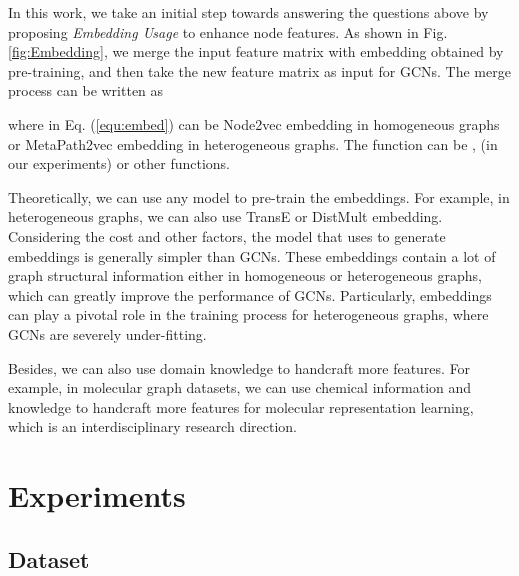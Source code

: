 \documentclass[runningheads]{llncs}
\begin{document}
In this work, we take an initial step towards answering the
questions above by proposing \textsl{Embedding Usage} to enhance node features. As shown in Fig. \ref{fig:Embedding}, we merge
the input feature matrix  with embedding obtained by
pre-training, and then take the new feature matrix as input for GCNs. The merge process can be written as


where  in Eq. (\ref{equ:embed}) can be Node2vec embedding in homogeneous graphs or MetaPath2vec \cite{dong2017metapath2vec} embedding in heterogeneous graphs. The  function can be ,  (in our
experiments) or other functions. 

Theoretically, we can use any model to pre-train the embeddings. For
example, in heterogeneous graphs, we can also use TransE \cite{bordes2013translating} or DistMult \cite{yang2014embedding} 
embedding. Considering the cost and other factors, the model that uses to generate embeddings is
generally simpler than GCNs. These embeddings contain a lot of graph structural
information either in homogeneous or 
heterogeneous graphs, which can greatly improve the performance of GCNs.
Particularly, embeddings can play a pivotal role in the training process for heterogeneous graphs, where GCNs are severely under-fitting.

Besides, we can also use domain knowledge to
handcraft more features. For example, in molecular graph datasets, we can use chemical information and knowledge to handcraft more features for molecular representation learning, which is an interdisciplinary research direction.

\section{Experiments}\label{experiments}
\subsection{Dataset}
\end{document}
